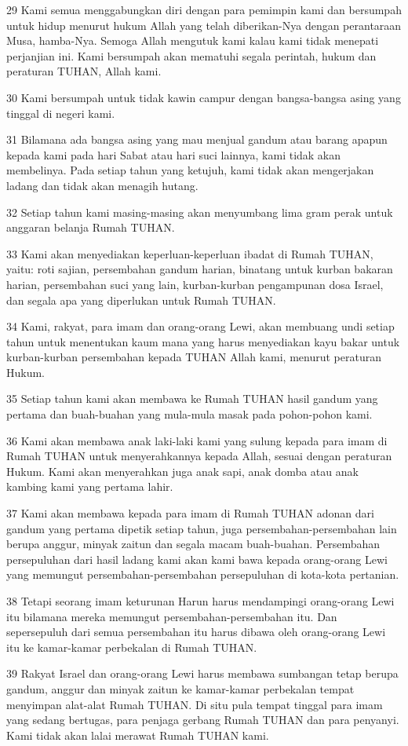 \par 29 Kami semua menggabungkan diri dengan para pemimpin kami dan bersumpah untuk hidup menurut hukum Allah yang telah diberikan-Nya dengan perantaraan Musa, hamba-Nya. Semoga Allah mengutuk kami kalau kami tidak menepati perjanjian ini. Kami bersumpah akan mematuhi segala perintah, hukum dan peraturan TUHAN, Allah kami.
\par 30 Kami bersumpah untuk tidak kawin campur dengan bangsa-bangsa asing yang tinggal di negeri kami.
\par 31 Bilamana ada bangsa asing yang mau menjual gandum atau barang apapun kepada kami pada hari Sabat atau hari suci lainnya, kami tidak akan membelinya. Pada setiap tahun yang ketujuh, kami tidak akan mengerjakan ladang dan tidak akan menagih hutang.
\par 32 Setiap tahun kami masing-masing akan menyumbang lima gram perak untuk anggaran belanja Rumah TUHAN.
\par 33 Kami akan menyediakan keperluan-keperluan ibadat di Rumah TUHAN, yaitu: roti sajian, persembahan gandum harian, binatang untuk kurban bakaran harian, persembahan suci yang lain, kurban-kurban pengampunan dosa Israel, dan segala apa yang diperlukan untuk Rumah TUHAN.
\par 34 Kami, rakyat, para imam dan orang-orang Lewi, akan membuang undi setiap tahun untuk menentukan kaum mana yang harus menyediakan kayu bakar untuk kurban-kurban persembahan kepada TUHAN Allah kami, menurut peraturan Hukum.
\par 35 Setiap tahun kami akan membawa ke Rumah TUHAN hasil gandum yang pertama dan buah-buahan yang mula-mula masak pada pohon-pohon kami.
\par 36 Kami akan membawa anak laki-laki kami yang sulung kepada para imam di Rumah TUHAN untuk menyerahkannya kepada Allah, sesuai dengan peraturan Hukum. Kami akan menyerahkan juga anak sapi, anak domba atau anak kambing kami yang pertama lahir.
\par 37 Kami akan membawa kepada para imam di Rumah TUHAN adonan dari gandum yang pertama dipetik setiap tahun, juga persembahan-persembahan lain berupa anggur, minyak zaitun dan segala macam buah-buahan. Persembahan persepuluhan dari hasil ladang kami akan kami bawa kepada orang-orang Lewi yang memungut persembahan-persembahan persepuluhan di kota-kota pertanian.
\par 38 Tetapi seorang imam keturunan Harun harus mendampingi orang-orang Lewi itu bilamana mereka memungut persembahan-persembahan itu. Dan sepersepuluh dari semua persembahan itu harus dibawa oleh orang-orang Lewi itu ke kamar-kamar perbekalan di Rumah TUHAN.
\par 39 Rakyat Israel dan orang-orang Lewi harus membawa sumbangan tetap berupa gandum, anggur dan minyak zaitun ke kamar-kamar perbekalan tempat menyimpan alat-alat Rumah TUHAN. Di situ pula tempat tinggal para imam yang sedang bertugas, para penjaga gerbang Rumah TUHAN dan para penyanyi. Kami tidak akan lalai merawat Rumah TUHAN kami.

